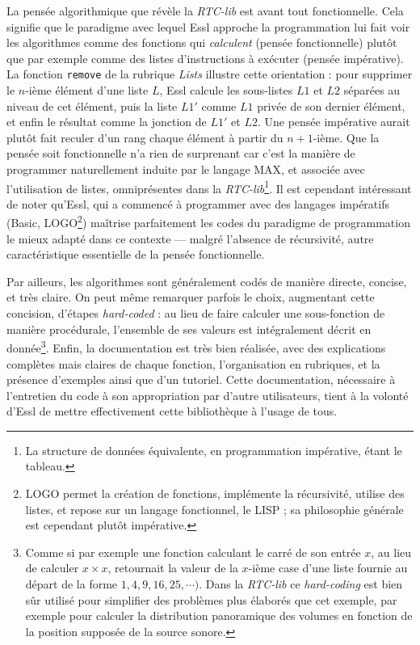 \documentclass[a4paper,12pt]{article}
\begin{document}
La pensée algorithmique que révèle la \emph{RTC-lib} est avant tout fonctionnelle. Cela signifie que le paradigme avec lequel Essl approche la programmation lui fait voir les algorithmes comme des fonctions qui \emph{calculent} (pensée fonctionnelle) plutôt que par exemple comme des listes d'instructions à exécuter (pensée impérative). La fonction \texttt{remove} de la rubrique \emph{Lists} illustre cette orientation : pour supprimer le $n$-ième élément d'une liste $L$, Essl calcule les sous-listes $L1$ et $L2$ séparées au niveau de cet élément, puis la liste $L1'$ comme $L1$ privée de son dernier élément, et enfin le résultat comme la jonction de $L1'$ et $L2$. Une pensée impérative aurait plutôt fait reculer d'un rang chaque élément à partir du $n+1$-ième. Que la pensée soit fonctionnelle n'a rien de surprenant car c'est la manière de programmer naturellement induite par le langage MAX, et associée avec l'utilisation de listes, omniprésentes dans la \emph{RTC-lib}\footnote{La structure de données équivalente, en programmation impérative, étant le tableau.}. Il est cependant intéressant de noter qu'Essl, qui a commencé à programmer avec des langages impératifs (Basic, LOGO\footnote{LOGO permet la création de fonctions, implémente la récursivité, utilise des listes, et repose sur un langage fonctionnel, le LISP ; sa philosophie générale est cependant plutôt impérative.}) maîtrise parfaitement les codes du paradigme de programmation le mieux adapté dans ce contexte --- malgré l'absence de récursivité, autre caractéristique essentielle de la pensée fonctionnelle.

Par ailleurs, les algorithmes sont généralement codés de manière directe, concise, et très claire. On peut même remarquer parfois le choix, augmentant cette concision, d'étapes \emph{hard-coded} : au lieu de faire calculer une sous-fonction de manière procédurale, l'ensemble de ses valeurs est intégralement décrit en donnée\footnote{Comme si par exemple une fonction calculant le carré de son entrée $x$, au lieu de calculer $x\times x$, retournait la valeur de la $x$-ième case d'une liste fournie au départ de la forme $1,4,9,16,25,\cdots)$. Dans la \emph{RTC-lib} ce \emph{hard-coding} est bien sûr utilisé pour simplifier des problèmes plus élaborés que cet exemple, par exemple pour calculer la distribution panoramique des volumes en fonction de la position supposée de la source sonore.}. Enfin, la documentation est très bien réalisée, avec des explications complètes mais claires de chaque fonction, l'organisation en rubriques, et la présence d'exemples ainsi que d'un tutoriel. Cette documentation, nécessaire à l'entretien du code à son appropriation par d'autre utilisateurs, tient à la volonté d'Essl de mettre effectivement cette bibliothèque à l'usage de tous.
\end{document}

